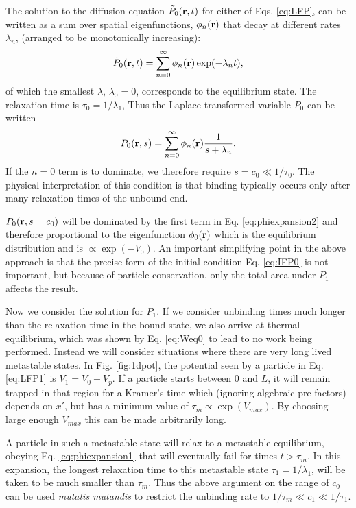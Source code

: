 \documentclass[journal = mamobx, manuscript = article]{achemso}
\def\br{{\bf r}}
\begin{document}
The solution to the diffusion equation $\tilde{P}_0(\br,t)$ for either of Eqs.
\ref{eq:LFP}, can be written as a sum over spatial
eigenfunctions, $\phi_n(\br)$ that decay at different rates $\lambda_n$,
(arranged to be monotonically increasing):
\begin{equation}
\label{eq:phiexpansion1}
\tilde{P}_0(\br,t) = \sum_{n=0}^\infty \phi_n(\br) \exp(-\lambda_n t), 
\end{equation}
of which the smallest $\lambda$, $\lambda_0 = 0$, corresponds to the equilibrium state. The relaxation
time is $\tau_0 = 1/\lambda_1$, Thus the Laplace
transformed variable $P_0$ can be written
\begin{equation}
\label{eq:phiexpansion2}
P_0(\br,s) = \sum_{n=0}^\infty \phi_n(\br) \frac{1}{s+\lambda_n} .
\end{equation}
If the $n=0$ term is to dominate, we therefore require $s = c_0 \ll 1/\tau_0$.
The physical interpretation of this condition is that binding typically occurs only after
many relaxation times of the unbound end.

$P_0(\br, s=c_0)$ will be dominated by the first term in Eq. \ref{eq:phiexpansion2}
and therefore proportional to the eigenfunction $\phi_0(\br)$ which is
the equilibrium distribution and is $\propto \exp(-V_0)$.
An important simplifying point in the above approach is that the precise form of
the initial condition Eq. \ref{eq:IFP0} is not important, but because of
particle conservation, only the total area under $P_1$ affects the result.


Now we consider the solution for $P_1$. If we consider unbinding times much
longer than the relaxation time in the bound state, we also arrive at thermal
equilibrium, which was shown by Eq. \ref{eq:Weq0} to lead to no work being performed. Instead
we will consider situations where there are very long lived metastable states.
In Fig. \ref{fig:1dpot}, the potential seen by a particle in Eq. \ref{eq:LFP1}
is $V_1 = V_0 + V_p$. If a particle starts between $0$ and $L$, it will remain
trapped in that region for a Kramer's time which (ignoring algebraic pre-factors)
depends on $x'$, but has a minimum value of $\tau_m \propto \exp(V_{max})$. By
choosing large enough $V_{max}$ this can be made arbitrarily long. 

A particle in such a metastable state will relax to a metastable equilibrium,
obeying Eq. \ref{eq:phiexpansion1} that will eventually fail for times $t >
\tau_m$. In this expansion, the longest relaxation time to this metastable state
$\tau_1 = 1/\lambda_1$,
will be taken to be much smaller than $\tau_m$. Thus the above argument on the
range of $c_0$ can be used {\em mutatis mutandis} to restrict
the unbinding rate to $1/\tau_m \ll c_1 \ll 1/\tau_1.$
\end{document}
